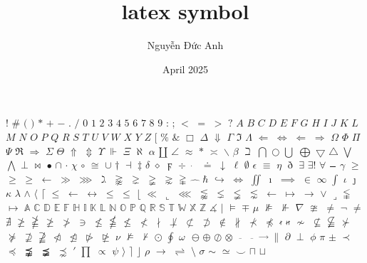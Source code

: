 \documentclass{article}
\title{latex symbol}
\author{Nguyễn Đức Anh}
\date{April 2025}
\begin{document}
!
$\#$
$($
$)$
$*$
$+$
$-$
.
$/$
$0$
$1$
$2$
$3$
$4$
$5$
$6$
$7$
$8$
$9$
:
;
$<$
$=$
$>$
$?$
$A$
$B$
$C$
$D$
$E$
$F$
$G$
$H$
$I$
$J$
$K$
$L$
$M$
$N$
$O$
$P$
$Q$
$R$
$S$
$T$
$U$
$V$
$W$
$X$
$Y$
$Z$
$[$
$\%$
$\&$
$\Box$
$\Delta$
$\Downarrow$
$\Gamma$
$\Im$
$\Lambda$
$\Leftarrow$
$\Leftrightarrow$
$\Longleftarrow$
$\Longrightarrow$
$\Omega$
$\Phi$
$\Pi$
$\Psi$
$\Re$
$\Rightarrow$
$\Sigma$
$\Theta$
$\Uparrow$
$\Updownarrow$
$\Upsilon$
$\Vdash$
$\Xi$
$\aleph$
$\alpha$
$\amalg$
$\angle$
$\approx$
$\ast$
$\asymp$
$\backslash$
$\beta$
$\beth$
$\bigcap$
$\bigcirc$
$\bigcup$
$\bigoplus$
$\bigtriangledown$
$\bigtriangleup$
$\bigvee$
$\bigwedge$
$\bot$
$\bowtie$
$\bullet$
$\cap$
$\cdot$
$\chi$
$\circ$
$\cong$
$\cup$
$\dagger$
$\dashv$
$\ddagger$
$\delta$
$\diamond$
$\digamma$
$\div$
$\dot{\;\;\;}$
$\doteq$
$\downarrow$
$\ell$
$\emptyset$
$\epsilon$
$\equiv$
$\eta$
$\eth$
$\exists$
$\exists!$
$\forall$
$\frac{\;\;\;}{\;\;\;}$
$\gamma$
$\ge$
$\geq$
$\geqslant$
$\gets$
$\gg$
$\ggg$
$\gimel$
$\gnapprox$
$\gneq$
$\gneqq$
$\gnsim$
$\gvertneqq$
$\hat{\;\;\;}$
$\hbar$
$\hookrightarrow$
$\iff$
$\iint$
$\imath$
$\implies$
$\in$
$\infty$
$\int$
$\iota$
$\jmath$
$\kappa$
$\lambda$
$\land$
$\langle$
$\lceil$
$\le$
$\leftarrow$
$\leftrightarrow$
$\leq$
$\leqslant$
$\lfloor$
$\ll$
$\llcorner$
$\lll$
$\lnapprox$
$\lneq$
$\lneqq$
$\lnsim$
$\longleftarrow$
$\longmapsto$
$\longrightarrow$
$\lor$
$\lrcorner$
$\lvertneqq$
$\mapsto$
$\mathbb{A}$
$\mathbb{C}$
$\mathbb{D}$
$\mathbb{E}$
$\mathbb{F}$
$\mathbb{H}$
$\mathbb{I}$
$\mathbb{K}$
$\mathbb{L}$
$\mathbb{N}$
$\mathbb{O}$
$\mathbb{P}$
$\mathbb{Q}$
$\mathbb{R}$
$\mathbb{S}$
$\mathbb{T}$
$\mathbb{W}$
$\mathbb{X}$
$\mathbb{Z}$
$\measuredangle$
$\mid$
$\models$
$\mp$
$\mu$
$\nVDash$
$\nVdash$
$\nabla$
$\ncong$
$\ne$
$\neg$
$\neq$
$\nexists$
$\ngeq$
$\ngeqq$
$\ngeqslant$
$\ngtr$
$\ni$
$\nleq$
$\nleqq$
$\nleqslant$
$\nless$
$\nmid$
$\not\perp$
$\not\subset$
$\not\supset$
$\notin$
$\nparallel$
$\nprec$
$\npreceq$
$\nshortmid$
$\nshortparallel$
$\nsim$
$\nsubseteq$
$\nsubseteqq$
$\nsucc$
$\nsucceq$
$\nsupseteq$
$\nsupseteqq$
$\ntriangleleft$
$\ntrianglelefteq$
$\ntriangleright$
$\ntrianglerighteq$
$\nu$
$\nvDash$
$\nvdash$
$\odot$
$\oint$
$\omega$
$\newcommand\omicron{o}$
$\ominus$
$\oplus$
$\oslash$
$\otimes$
$\overline{\;\;\;}$
$\overline{\;\;\;}$
$\overrightarrow{\;\;\;}$
$\parallel$
$\partial$
$\perp$
$\phi$
$\pi$
$\pm$
$\prec$
$\preceq$
$\precnapprox$
$\precneqq$
$\precnsim$
$\prime$
$\prod$
$\propto$
$\psi$
$\rangle$
$\rceil$
$\rfloor$
$\rho$
$\rightarrow$
$\rightleftharpoons$
$\setminus$
$\sigma$
$\sim$
$\simeq$
$\smile$
$\sqcap$
$\sqcup$
\end{document}
